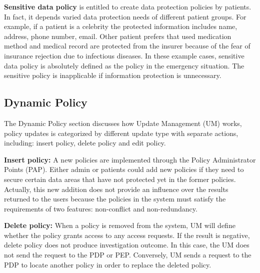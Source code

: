 \textbf{Sensitive data policy}
 is entitled to create data protection policies by patients.
In fact, it depends varied data protection needs of different patient groups. 
For example, if a patient is a celebrity the protected information includes name, address, phone number, email. 
Other patient prefers that used medication method and medical record are protected from the insurer because of the fear of insurance rejection due to infectious diseases.
In these example cases, sensitive data policy is absolutely defined as the policy in the emergency situation. 
The sensitive policy is inapplicable if information protection is unnecessary.


\subsection{Dynamic Policy}\label{App:DyPol}
The Dynamic Policy section discusses how Update Management (UM) works, policy updates is categorized by different update type with separate actions, including: insert policy, delete policy and edit policy.

\textbf{Insert policy:}
A new policies are implemented through the Policy Administrator Points (PAP). 
Either admin or patients could add new policies if they need to secure certain data areas that have not protected yet in the former policies. 
Actually, this new addition does not provide an influence over the results returned to the users because the policies in the system must satisfy the requirements of two features: non-conflict and non-redundancy.

\textbf{Delete policy:}
When a policy is removed from the system, UM will define whether the policy grants access to any access requests. 
If the result is negative, delete policy does not produce investigation outcome.
In this case, the UM does not send the request to the PDP or PEP.
Conversely, UM sends a request to the PDP to locate another policy in order to replace the deleted policy.

